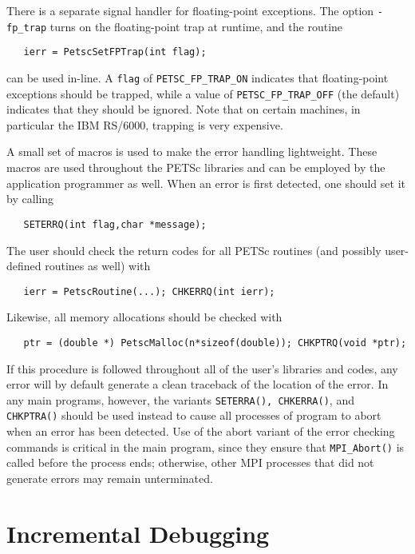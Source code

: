 There is a separate signal handler for floating-point exceptions.
  
The option {\tt -fp\_trap} turns on the floating-point trap at runtime,
and the routine   
\begin{verbatim}
   ierr = PetscSetFPTrap(int flag);
\end{verbatim}
can be used in-line.
A {\tt flag} of {\tt PETSC\_FP\_TRAP\_ON} 
indicates that floating-point exceptions should be trapped,
while a value of {\tt PETSC\_FP\_TRAP\_OFF} (the default) indicates that they 
should be ignored.  Note that on certain machines, in particular 
the IBM RS/6000, trapping is very expensive.

A small set of macros is used to make the error handling lightweight.
These macros are used throughout the PETSc libraries and can be employed
by the application    
programmer as well.  When an error is first detected, 
one should set it by calling
\begin{verbatim}
   SETERRQ(int flag,char *message);
\end{verbatim}
The user should check the return codes for all PETSc routines (and
possibly user-defined routines as well) with 
\begin{verbatim}
   ierr = PetscRoutine(...); CHKERRQ(int ierr);
\end{verbatim}
Likewise, all memory allocations should be checked with 
\begin{verbatim}
   ptr = (double *) PetscMalloc(n*sizeof(double)); CHKPTRQ(void *ptr);
\end{verbatim}
If this procedure is followed throughout all of the user's libraries 
and codes, any error will by default generate a clean traceback of 
the location   
of the error.  In any main programs, however, the variants
{\tt SETERRA(), CHKERRA()}, and {\tt CHKPTRA()} should be used instead 
to cause all processes of program to abort when an error has been detected. 
Use of the abort variant of the error checking commands is critical
in the main program, since they ensure that {\tt MPI\_Abort()} is called 
before the process ends; otherwise, other MPI processes that 
did not generate errors may remain unterminated.

\section{Incremental Debugging} 

